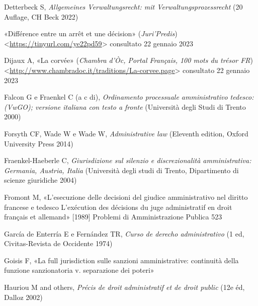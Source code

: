 \documentclass[12pt,it,a4paper,]{report}
\newlength{\cslhangindent}
\newenvironment{CSLReferences}[2] %
 {%
  \setlength{\parindent}{0pt}
  \ifodd #1 \everypar{\setlength{\hangindent}{\cslhangindent}}\ignorespaces\fi
  \ifnum #2 > 0
  \setlength{\parskip}{#2\baselineskip}
  \fi
 }%
 {}
\begin{document}
\begin{CSLReferences}{0}{0}
\leavevmode{}%
Detterbeck S, \emph{Allgemeines Verwaltungsrecht: mit
Verwaltungsprozessrecht} (20 Auflage, CH Beck 2022)

\leavevmode{}%
{«Différence entre un arrêt et une décision»} (\emph{Juri'Predis})
\textless{}\url{https://tinyurl.com/ye22pd59}\textgreater{} consultato
22 gennaio 2023

\leavevmode{}%
Dijaux A, {«La corvée»} (\emph{Chambra d'Òc, Portal Français, 100 mots
du trésor FR})
\textless{}\url{http://www.chambradoc.it/traditions/La-corvee.page}\textgreater{}
consultato 22 gennaio 2023

\leavevmode{}%
Falcon G e Fraenkel C (a c di), \emph{Ordinamento processuale
amministrativo tedesco: (VwGO); versione italiana con testo a fronte}
(Università degli Studi di Trento 2000)

\leavevmode{}%
Forsyth CF, Wade W e Wade W, \emph{Administrative law} (Eleventh
edition, Oxford University Press 2014)

\leavevmode{}%
Fraenkel-Haeberle C, \emph{Giurisdizione sul silenzio e discrezionalità
amministrativa: Germania, Austria, Italia} (Università degli studi di
Trento, Dipartimento di scienze giuridiche 2004)

\leavevmode{}%
Fromont M, {«L'esecuzione delle decisioni del giudice amministrativo nel
diritto francese e tedesco L'exécution des décisions du juge
administratif en droit français et allemand»} {[}1989{]} Problemi di
Amministrazione Publica 523

\leavevmode{}%
García de Enterría E e Fernández TR, \emph{Curso de derecho
administrativo} (1 ed, Civitas-Revista de Occidente 1974)

\leavevmode{}%
Goisis F, {«La full jurisdiction sulle sanzioni amministrative:
continuità della funzione sanzionatoria v. separazione dei poteri»}

\leavevmode{}%
Hauriou M and others, \emph{Précis de droit administratif et de droit
public} (12e éd, Dalloz 2002)


\end{CSLReferences}
\end{document}

